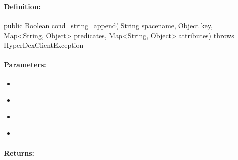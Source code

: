 \pagebreak
\subsubsection{}
\label{api:java:cond_string_append}


\paragraph{Definition:}
\begin{javacode}
public Boolean cond_string_append(
        String spacename,
        Object key,
        Map<String, Object> predicates,
        Map<String, Object> attributes) throws HyperDexClientException
\end{javacode}

\paragraph{Parameters:}
\begin{itemize}[noitemsep]
\item {}\\

\item {}\\

\item {}\\

\item {}\\

\end{itemize}

\paragraph{Returns:}


\pagebreak
\subsubsection{}
\label{api:java:async_cond_string_append}


